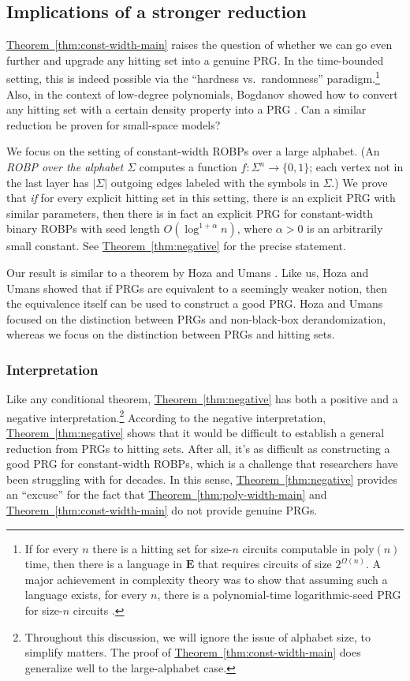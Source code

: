\documentclass[11pt]{article}
\numberwithin{equation}{section}
\theoremstyle{definition}
\theoremstyle{plain}
\newcommand{\expref}[2]{\hyperref[#2]{#1~\ref{#2}}}
\begin{document}
\subsection{Implications of a stronger reduction}
\expref{Theorem}{thm:const-width-main} raises the question of whether we can go even further and upgrade any hitting set into a genuine PRG. In the time-bounded setting, this is indeed possible via the ``hardness vs.\ randomness'' paradigm.\footnote{If for every $n$ there is a hitting set for size-$n$ circuits computable in $\text{poly}(n)$ time, then there is a language in $\mathbf{E}$ that requires circuits of size $2^{\Omega(n)}$. A major achievement in complexity theory was to show that assuming such a language exists, for every $n$, there is a polynomial-time logarithmic-seed PRG for size-$n$ circuits \cite{IW97}.} Also, in the context of low-degree polynomials, Bogdanov showed how to convert any hitting set with a certain density property into a PRG \cite{Bog05}. Can a similar reduction be proven for small-space models?

We focus on the setting of constant-width ROBPs over a large alphabet. (An \emph{ROBP over the alphabet $\Sigma$} computes a function $f \colon \Sigma^n \to \{0, 1\}$; each vertex not in the last layer has $|\Sigma|$ outgoing edges labeled with the symbols in $\Sigma$.) We prove that \emph{if} for every explicit hitting set in this setting, there is an explicit PRG with similar parameters, then there is in fact an explicit PRG for constant-width binary ROBPs with seed length $O(\log^{1 + \alpha} n)$, where $\alpha > 0$ is an arbitrarily small constant. See \expref{Theorem}{thm:negative} for the precise statement.

Our result is similar to a theorem by Hoza and Umans \cite{HU22}. Like us, Hoza and Umans showed that if PRGs are equivalent to a seemingly weaker notion, then the equivalence itself can be used to construct a good PRG. Hoza and Umans focused on the distinction between PRGs and non-black-box derandomization, whereas we focus on the distinction between PRGs and hitting sets.

\subsubsection{Interpretation}
Like any conditional theorem, \expref{Theorem}{thm:negative} has both a positive and a negative interpretation.\footnote{Throughout this discussion, we will ignore the issue of alphabet size, to simplify matters. The proof of \expref{Theorem}{thm:const-width-main} does generalize well to the large-alphabet case.} According to the negative interpretation, \expref{Theorem}{thm:negative} shows that it would be difficult to establish a general reduction from PRGs to hitting sets. After all, it's as difficult as constructing a good PRG for constant-width ROBPs, which is a challenge that researchers have been struggling with for decades. In this sense, \expref{Theorem}{thm:negative} provides an ``excuse'' for the fact that \expref{Theorem}{thm:poly-width-main} and \expref{Theorem}{thm:const-width-main} do not provide genuine PRGs.
\end{document}
